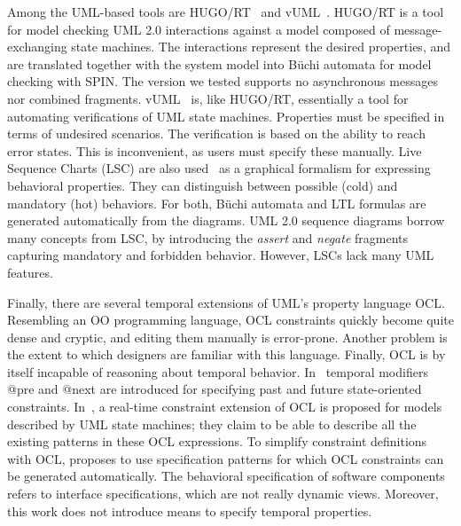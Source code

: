 \documentclass[letter]{llncs}
\begin{document}
Among the UML-based tools are
HUGO/RT~\cite{Knapp:2006:MCU:1762828.1762836} and
vUML~\cite{Lilius99vuml:a}.  HUGO/RT is a tool for model checking
UML 2.0 interactions against a model composed of message-exchanging
state machines. The interactions represent the desired properties,
and are translated together with the system model into B\"uchi automata
for model checking with SPIN.  The version we tested supports no
asynchronous messages nor combined fragments.  vUML~\cite{Lilius99vuml:a}
is, like HUGO/RT, essentially a tool for automating verifications
of UML state machines.  Properties must be specified in terms of
undesired scenarios.  The verification is based on the ability
to reach error states. This is inconvenient, as users
must specify these manually.  Live Sequence Charts (LSC) are also
used~\cite{Kugler:2005:TLS:2140653.2140692,MVPSA} as a graphical
formalism for expressing behavioral properties.  They can distinguish
between possible (cold) and mandatory (hot) behaviors.  For both, B\"uchi
automata and LTL formulas are generated automatically from the diagrams.
UML 2.0 sequence diagrams borrow many concepts from LSC, by introducing
the \emph{assert} and \emph{negate} fragments capturing mandatory and
forbidden behavior. However, LSCs lack many UML features.
  
  Finally, there are several temporal extensions of UML's property
  language OCL. Resembling an OO programming language, OCL constraints
quickly become quite dense and cryptic, and editing them manually is
error-prone. Another problem is the extent to which designers are
familiar with this language.  Finally, OCL is by itself incapable
of reasoning about temporal behavior.  In~\cite{Ziemann02anextension}
temporal modifiers @pre and @next are introduced for specifying past and
future state-oriented constraints.  In~\cite{Flake03formalsemantics},
a real-time constraint extension of OCL is proposed for models described
by UML state machines; they claim to be able to describe all the existing
patterns in these OCL expressions.  To simplify constraint definitions
with OCL, \cite{Ackermann:2006:LOS:2135315.2135339} proposes 
to use specification patterns for which OCL constraints can be generated
automatically.  The behavioral specification of software components refers
to interface specifications, which are not really dynamic views. Moreover,
this work does not introduce means to specify temporal properties.
\vspace{-7 pt}
\end{document}
